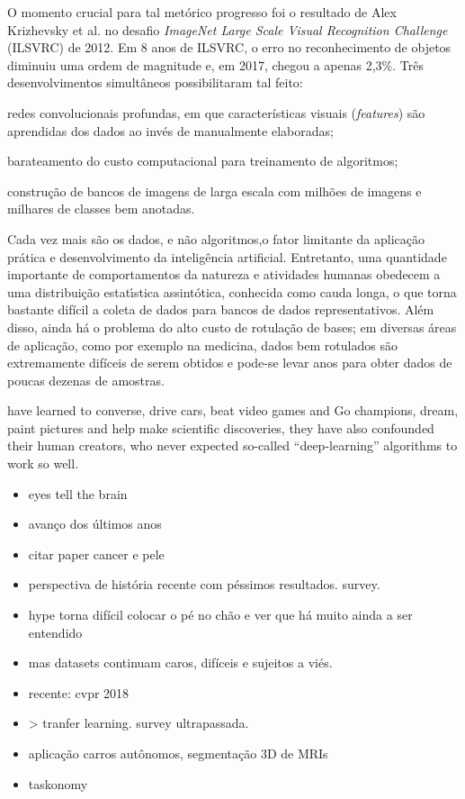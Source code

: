 \documentclass[
12pt, %
a4paper, %
onecolumn, %
]{article}
\begin{document}
O momento crucial para tal metórico progresso foi o resultado de Alex Krizhevsky et al.\cite{alexnet} no desafio \textit{ImageNet Large Scale Visual Recognition Challenge}  (ILSVRC) de 2012\cite{goodfellow}. Em 8 anos de ILSVRC, o erro no reconhecimento de objetos diminuiu uma ordem de magnitude\cite{fei} e, em 2017, chegou a apenas 2,3\%. Três desenvolvimentos simultâneos possibilitaram tal feito\cite{horn}: 
\begin{enumerate*}[label=(\alph*)]
  \item redes convolucionais profundas, em que características visuais (\textit{features}) são aprendidas dos dados ao invés de manualmente elaboradas;
  \item barateamento do custo computacional para treinamento de algoritmos;
  \item construção de bancos de imagens de larga escala com milhões de imagens e milhares de classes bem anotadas. 
\end{enumerate*}

Cada vez mais são os dados, e não algoritmos,o fator limitante da aplicação prática e desenvolvimento da inteligência artificial\cite{imagenet}. Entretanto, uma quantidade importante de comportamentos da natureza e atividades humanas obedecem a uma distribuição estatı́stica assintótica, conhecida como cauda longa, o que torna bastante difícil a coleta de dados para bancos de dados representativos. Além disso, ainda há o problema do alto custo de rotulação de bases; em diversas áreas de aplicação, como por exemplo na medicina, dados bem rotulados são extremamente difíceis de serem obtidos e pode-se levar anos para obter dados de poucas dezenas de amostras.


have learned to converse, drive cars, beat video games and Go champions, dream, paint pictures and help make scientific discoveries, they have also confounded their human creators, who never expected so-called “deep-learning” algorithms to work so well. 
\begin{itemize}

  \item eyes tell the brain 
  \item avanço dos últimos anos
  \item citar paper cancer e pele
  \item perspectiva de história recente com péssimos resultados. survey. 
  \item hype torna difícil colocar o pé no chão e ver que há muito ainda a ser entendido
  \item mas datasets continuam caros, difíceis e sujeitos a viés. 
  \item recente: cvpr 2018  \item> tranfer learning. survey ultrapassada.
  \item aplicação carros autônomos, segmentação 3D de MRIs
  \item taskonomy
\end{itemize}
\end{document}
